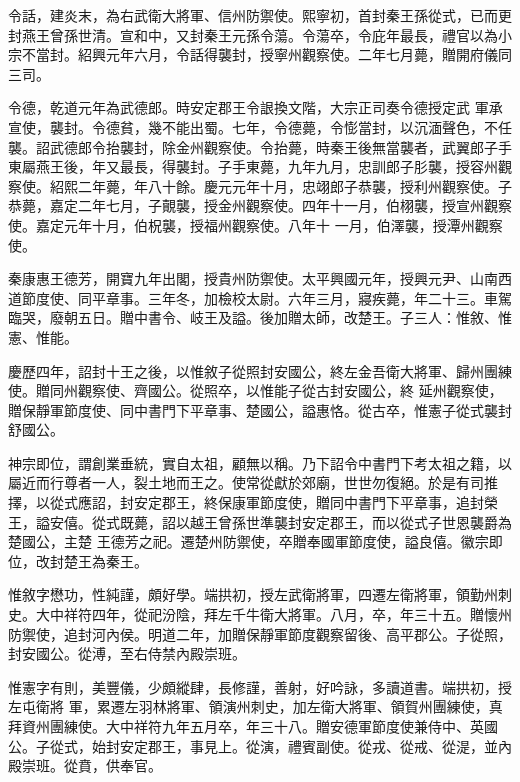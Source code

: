 \begin{pinyinscope}
 令話，建炎末，為右武衛大將軍、信州防禦使。熙寧初，首封秦王孫從式，已而更封燕王曾孫世清。宣和中，又封秦王元孫令蕩。令蕩卒，令庇年最長，禮官以為小宗不當封。紹興元年六月，令話得襲封，授寧州觀察使。二年七月薨，贈開府儀同三司。



 令德，乾道元年為武德郎。時安定郡王令詪換文階，大宗正司奏令德授定武
 軍承宣使，襲封。令德貧，幾不能出蜀。七年，令德薨，令憉當封，以沉湎聲色，不任襲。詔武德郎令抬襲封，除金州觀察使。令抬薨，時秦王後無當襲者，武翼郎子手東屬燕王後，年又最長，得襲封。子手東薨，九年九月，忠訓郎子肜襲，授容州觀察使。紹熙二年薨，年八十餘。慶元元年十月，忠翊郎子恭襲，授利州觀察使。子恭薨，嘉定二年七月，子覿襲，授金州觀察使。四年十一月，伯栩襲，授宣州觀察使。嘉定元年十月，伯柷襲，授福州觀察使。八年十
 一月，伯澤襲，授潭州觀察使。



 秦康惠王德芳，開寶九年出閣，授貴州防禦使。太平興國元年，授興元尹、山南西道節度使、同平章事。三年冬，加檢校太尉。六年三月，寢疾薨，年二十三。車駕臨哭，廢朝五日。贈中書令、岐王及謚。後加贈太師，改楚王。子三人：惟敘、惟憲、惟能。



 慶歷四年，詔封十王之後，以惟敘子從照封安國公，終左金吾衛大將軍、歸州團練使。贈同州觀察使、齊國公。從照卒，以惟能子從古封安國公，終
 延州觀察使，贈保靜軍節度使、同中書門下平章事、楚國公，謚惠恪。從古卒，惟憲子從式襲封舒國公。



 神宗即位，謂創業垂統，實自太祖，顧無以稱。乃下詔令中書門下考太祖之籍，以屬近而行尊者一人，裂土地而王之。使常從獻於郊廟，世世勿復絕。於是有司推擇，以從式應詔，封安定郡王，終保康軍節度使，贈同中書門下平章事，追封榮王，謚安僖。從式既薨，詔以越王曾孫世準襲封安定郡王，而以從式子世恩襲爵為楚國公，主楚
 王德芳之祀。遷楚州防禦使，卒贈奉國軍節度使，謚良僖。徽宗即位，改封楚王為秦王。



 惟敘字懋功，性純謹，頗好學。端拱初，授左武衛將軍，四遷左衛將軍，領勤州刺史。大中祥符四年，從祀汾陰，拜左千牛衛大將軍。八月，卒，年三十五。贈懷州防禦使，追封河內侯。明道二年，加贈保靜軍節度觀察留後、高平郡公。子從照，封安國公。從溥，至右侍禁內殿崇班。



 惟憲字有則，美豐儀，少頗縱肆，長修謹，善射，好吟詠，多讀道書。端拱初，授左屯衛將
 軍，累遷左羽林將軍、領演州刺史，加左衛大將軍、領賀州團練使，真拜資州團練使。大中祥符九年五月卒，年三十八。贈安德軍節度使兼侍中、英國公。子從式，始封安定郡王，事見上。從演，禮賓副使。從戎、從戒、從湜，並內殿崇班。從賁，供奉官。




\end{pinyinscope}
